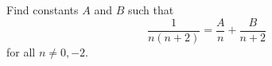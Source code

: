 Find constants $A$ and $B$ such that
\[
\dfrac{1}{n(n+2)}=\dfrac {A}{n}+\dfrac{B}{n+2}
\]
for all $n\ne0,-2$.

